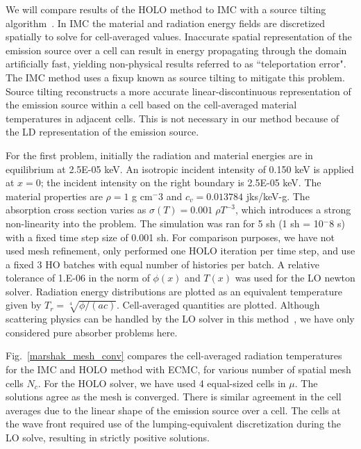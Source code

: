 \documentclass{mc2013}
\begin{document}
We will compare results of the HOLO method to IMC with
a source tilting algorithm~\cite{jayenne}. In IMC the material and radiation energy fields are discretized spatially to solve for cell-averaged values.
Inaccurate spatial representation of the emission source over a cell can result in
energy propagating through the domain artificially fast, yielding non-physical
results referred to as ``teleportation error".  The IMC method uses a fixup known as source tilting
to mitigate this problem.  Source tilting reconstructs a more accurate
linear-discontinuous representation of the
emission source within a cell based on the cell-averaged material temperatures in adjacent
cells. This is not necessary in our method because of the LD representation of the
emission source.  

For the first problem, initially the radiation and material energies are in
equilibrium at 2.5E-05 keV.   An isotropic incident intensity of 0.150 keV is applied
at $x=0$; the incident intensity on the right boundary is 2.5E-05 keV.
The material properties are $\rho = 1$ g cm$^-3$ and $c_v = 0.013784$ jks/keV-g. The
absorption cross section varies as $\sigma(T) = 0.001\;\rho T^{-3}$, which introduces
a strong non-linearity into the problem. The simulation was ran for 5 sh (1 sh =
10$^-8$ s) with a fixed time step size of 0.001 sh. For comparison purposes, we have not used mesh
refinement, only performed one HOLO iteration per time
step, and use a fixed 3 HO batches with equal number of histories per batch. A relative tolerance of 1.E-06 in the
norm of $\phi(x)$ and $T(x)$ was used for the LO newton solver. Radiation energy
distributions are plotted as an equivalent temperature given by
$T_r=\sqrt[4]{\phi/(ac)}$.  Cell-averaged quantities are plotted.
Although scattering physics
can be handled by the LO solver in this method~\cite{ans_2014}, we have only considered pure absorber
problems here.  


Fig.~\ref{marshak_mesh_conv} compares the cell-averaged radiation temperatures  for the
IMC and HOLO method with ECMC, for various number of spatial mesh cells $N_c$.  For the HOLO solver, we have used
4 equal-sized cells in $\mu$. The solutions agree as the mesh is converged.  There is similar agreement in the 
cell averages due to the linear shape of the emission source over a cell.  The cells
at the wave front required use of the lumping-equivalent discretization during the LO
solve, resulting in strictly positive solutions.
\end{document}
